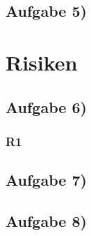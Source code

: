 \documentclass{swp1}
\begin{document}
\subsection*{Aufgabe 5)}
\section*{Risiken}     

\subsection*{Aufgabe 6)}
\subsubsection*{R1}

\subsection*{Aufgabe 7)}
\subsection*{Aufgabe 8)}
     
\end{document}

